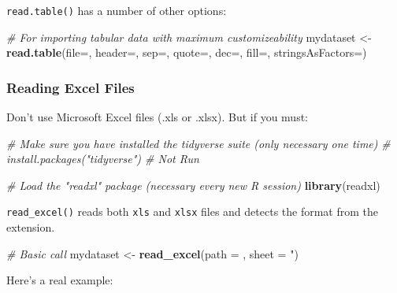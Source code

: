 \documentclass[]{book}
\newenvironment{Shaded}{\begin{snugshade}}{\end{snugshade}}
\newcommand{\CommentTok}[1]{\textcolor[rgb]{0.56,0.35,0.01}{\textit{#1}}}
\newcommand{\DataTypeTok}[1]{\textcolor[rgb]{0.13,0.29,0.53}{#1}}
\newcommand{\KeywordTok}[1]{\textcolor[rgb]{0.13,0.29,0.53}{\textbf{#1}}}
\newcommand{\NormalTok}[1]{#1}
\newcommand{\StringTok}[1]{\textcolor[rgb]{0.31,0.60,0.02}{#1}}
\begin{document}
\texttt{read.table()} has a number of other options:

\begin{Shaded}
\begin{Highlighting}[]
\CommentTok{# For importing tabular data with maximum customizeability}
\NormalTok{mydataset <-}\StringTok{ }\KeywordTok{read.table}\NormalTok{(}\DataTypeTok{file=}\NormalTok{, }\DataTypeTok{header=}\NormalTok{, }\DataTypeTok{sep=}\NormalTok{, }\DataTypeTok{quote=}\NormalTok{, }\DataTypeTok{dec=}\NormalTok{, }\DataTypeTok{fill=}\NormalTok{, }\DataTypeTok{stringsAsFactors=}\NormalTok{)}
\end{Highlighting}
\end{Shaded}

\hypertarget{reading-excel-files}{%
\subsubsection*{Reading Excel Files}\label{reading-excel-files}}

Don't use Microsoft Excel files (.xls or .xlsx). But if you must:

\begin{Shaded}
\begin{Highlighting}[]
\CommentTok{# Make sure you have installed the tidyverse suite (only necessary one time)}
\CommentTok{# install.packages("tidyverse") # Not Run}

\CommentTok{# Load the "readxl" package (necessary every new R session)}
\KeywordTok{library}\NormalTok{(readxl)}
\end{Highlighting}
\end{Shaded}

\texttt{read\_excel()} reads both \texttt{xls} and \texttt{xlsx} files and detects the format from the extension.

\begin{Shaded}
\begin{Highlighting}[]
\CommentTok{# Basic call}
\NormalTok{mydataset <-}\StringTok{ }\KeywordTok{read_excel}\NormalTok{(}\DataTypeTok{path =}\NormalTok{ , }\DataTypeTok{sheet =} \StringTok{")}
\end{Highlighting}
\end{Shaded}

Here's a real example:
\end{document}
